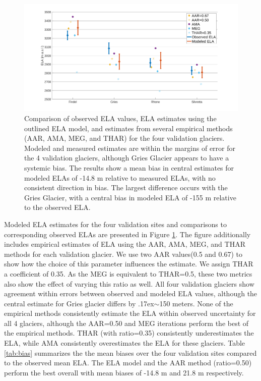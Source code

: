 \documentclass[review]{elsarticle}
\newcommand{\mytilde}{\raise.17ex\hbox{$\scriptstyle\mathtt{\sim}$}}
\begin{document}
\begin{figure}
    \centering
    \includegraphics[width=\textwidth]{Figures/ELAs.png}
    \caption{Comparison of observed ELA values, ELA estimates using the outlined ELA model, and estimates from several empirical methods (AAR, AMA, MEG, and THAR) for the four validation glaciers. Modeled and measured estimates are within the margins of error for the 4 validation glaciers, although Gries Glacier appears to have a systemic bias. The results show a mean bias in central estimates for modeled ELAs of -14.8 m relative to measured ELAs, with no consistent direction in bias. The largest difference occurs with the Gries Glacier, with a central bias in modeled ELA of -155 m relative to the observed  ELA.}
    \label{fig:elas}
\end{figure}

Modeled ELA estimates for the four validation sites and comparisons to corresponding observed ELAs are presented in Figure \ref{fig:elas}.
The figure additionally includes empirical estimates of ELA using the AAR, AMA, MEG, and THAR methods for each validation glacier.
We use two AAR values(0.5 and 0.67) to show how the choice of this parameter influences the estimate.
We assign THAR a coefficient of 0.35.
As the MEG is equivalent to THAR=0.5, these two metrics also show the effect of varying this ratio as well.
All four validation glaciers show agreement within errors between observed and modeled ELA values, although the central estimate for Gries glacier differs by \mytilde150 meters.
None of the empirical methods consistently estimate the ELA within observed uncertainty for all 4 glaciers, although the AAR=0.50 and MEG iterations perform the best of the empirical methods.
THAR (with ratio=0.35) consistently underestimates the ELA, while AMA consistently overestimates the ELA for these glaciers.
Table \ref{tab:bias} summarizes the the mean biases over the four validation sites compared to the observed mean ELA.
The ELA model and the AAR method (ratio=0.50) perform the best overall with mean biases of -14.8 m and 21.8 m respectively.
\end{document}

